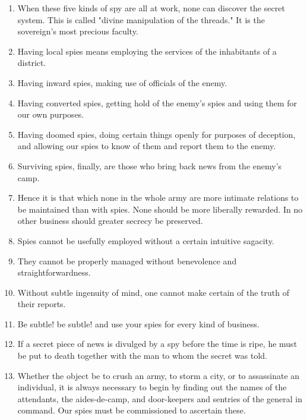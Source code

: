 \begin{enumerate}
  \item When these five kinds of spy are all at work, none can
    discover the secret system. This is called "divine manipulation of
    the threads." It is the sovereign's most precious faculty.

  \item Having local spies means employing the services of the
    inhabitants of a district.

  \item Having inward spies, making use of officials of the enemy.

  \item Having converted spies, getting hold of the enemy's spies and
    using them for our own purposes.

  \item Having doomed spies, doing certain things openly for purposes
    of deception, and allowing our spies to know of them and report
    them to the enemy.

  \item Surviving spies, finally, are those who bring back news from
    the enemy's camp.

  \item Hence it is that which none in the whole army are more
    intimate relations to be maintained than with spies. None should
    be more liberally rewarded. In no other business should greater
    secrecy be preserved.

  \item Spies cannot be usefully employed without a certain intuitive
    sagacity.

  \item They cannot be properly managed without benevolence and
    straightforwardness.

  \item Without subtle ingenuity of mind, one cannot make certain of
    the truth of their reports.

  \item Be subtle! be subtle! and use your spies for every kind of
    business.

  \item If a secret piece of news is divulged by a spy before the time
    is ripe, he must be put to death together with the man to whom the
    secret was told.

  \item Whether the object be to crush an army, to storm a city, or to
    assassinate an individual, it is always necessary to begin by
    finding out the names of the attendants, the aides-de-camp, and
    door-keepers and sentries of the general in command. Our spies
    must be commissioned to ascertain these.


\end{enumerate}
